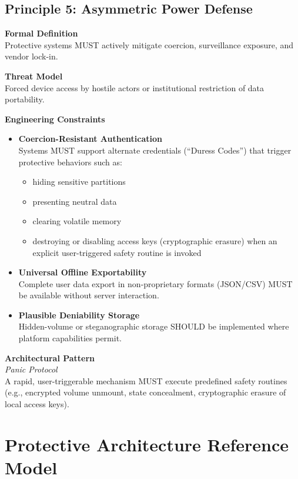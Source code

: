 \documentclass[12pt]{article}
\begin{document}
\subsection{Principle 5: Asymmetric Power Defense}

\textbf{Formal Definition}\\
Protective systems MUST actively mitigate coercion, surveillance exposure, and vendor lock-in.

\textbf{Threat Model}\\
Forced device access by hostile actors or institutional restriction of data portability.

\textbf{Engineering Constraints}
\begin{itemize}
\item \textbf{Coercion-Resistant Authentication}\\
  Systems MUST support alternate credentials (``Duress Codes'')
  that trigger protective behaviors such as:
  \begin{itemize}
  \item hiding sensitive partitions
  \item presenting neutral data
  \item clearing volatile memory
  \item destroying or disabling access keys (cryptographic erasure) when an explicit user-triggered safety routine is invoked
  \end{itemize}
\item \textbf{Universal Offline Exportability}\\
  Complete user data export in non-proprietary formats (JSON/CSV)
  MUST be available without server interaction.
\item \textbf{Plausible Deniability Storage}\\
  Hidden-volume or steganographic storage SHOULD be implemented
  where platform capabilities permit.
\end{itemize}

\textbf{Architectural Pattern}\\
\emph{Panic Protocol}\\
A rapid, user-triggerable mechanism MUST execute predefined safety routines
(e.g., encrypted volume unmount, state concealment, cryptographic erasure of local access keys).

\section{Protective Architecture Reference Model}
\end{document}
